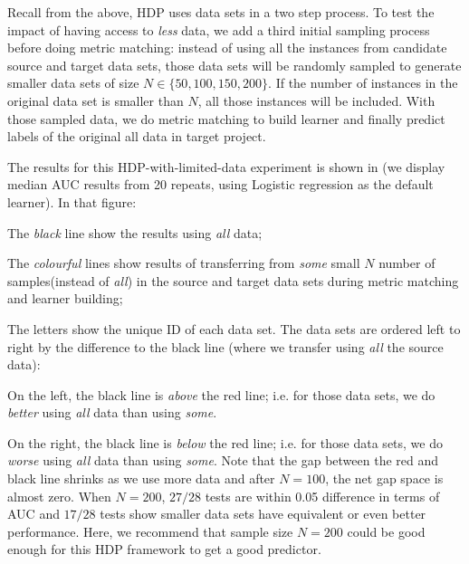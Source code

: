 Recall from the above,
HDP uses  data sets  in a two step process.
To test the impact of having access to {\em less} data,
we  add a third initial sampling process before doing metric matching:
instead of using all the instances from
candidate source and target data sets, those data sets will
be randomly sampled to generate smaller data sets of
size $N \in \{50, 100, 150, 200\}$. If
the number of instances in the original data set is
smaller than $N$, all those instances will be
included. With those sampled data, we do metric matching to build learner
and finally predict labels of the original all data in  target project.

The results for this HDP-with-limited-data experiment is shown in 
(we display median AUC results from 20 repeats, using  Logistic regression
as the default learner). 
In that figure:
\bi
\item
  The {\em black} line show the results using {\em all} data;
\item
  The {\em colourful} lines show results of transferring from {\em some} small $N$ number of samples(instead of {\em all})
  in the source and target data sets during metric matching and learner building;
\item
  The letters show the unique ID of each data set.
\ei
The data sets are ordered left to right by the difference to the black line (where we transfer using {\em
  all} the source data):
\bi
\item
  On the left, the black line is
  {\em above} the red line; i.e. for those data sets, we do {\em better} using
  {\em all} data than using {\em some}.
  \item
On the right, the black line is {\em below} the red
line; i.e. for those data sets, we do {\em worse}
using {\em all} data than using {\em some}.  \ei
Note that the gap between the red and black line
shrinks as we use more data and after $N=100$, the
net gap space is almost zero.  When $N=200$, $27/28$
tests are within 0.05 difference in terms of AUC and
$17/28$ tests show smaller data sets have equivalent
or even better performance. Here, we recommend that
sample size $N=200$ could be good enough for this
HDP framework to get a good predictor.



